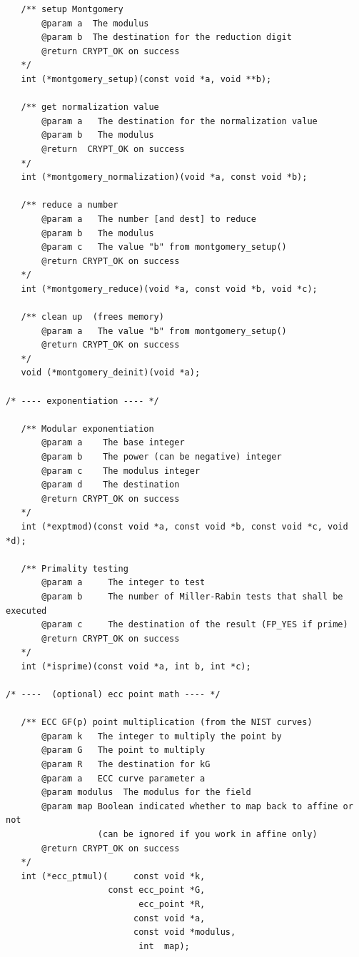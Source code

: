 \documentclass[synpaper]{book}
\begin{document}
\begin{small}
\begin{verbatim}
   /** setup Montgomery
       @param a  The modulus
       @param b  The destination for the reduction digit
       @return CRYPT_OK on success
   */
   int (*montgomery_setup)(const void *a, void **b);

   /** get normalization value
       @param a   The destination for the normalization value
       @param b   The modulus
       @return  CRYPT_OK on success
   */
   int (*montgomery_normalization)(void *a, const void *b);

   /** reduce a number
       @param a   The number [and dest] to reduce
       @param b   The modulus
       @param c   The value "b" from montgomery_setup()
       @return CRYPT_OK on success
   */
   int (*montgomery_reduce)(void *a, const void *b, void *c);

   /** clean up  (frees memory)
       @param a   The value "b" from montgomery_setup()
       @return CRYPT_OK on success
   */
   void (*montgomery_deinit)(void *a);

/* ---- exponentiation ---- */

   /** Modular exponentiation
       @param a    The base integer
       @param b    The power (can be negative) integer
       @param c    The modulus integer
       @param d    The destination
       @return CRYPT_OK on success
   */
   int (*exptmod)(const void *a, const void *b, const void *c, void *d);

   /** Primality testing
       @param a     The integer to test
       @param b     The number of Miller-Rabin tests that shall be executed
       @param c     The destination of the result (FP_YES if prime)
       @return CRYPT_OK on success
   */
   int (*isprime)(const void *a, int b, int *c);

/* ----  (optional) ecc point math ---- */

   /** ECC GF(p) point multiplication (from the NIST curves)
       @param k   The integer to multiply the point by
       @param G   The point to multiply
       @param R   The destination for kG
       @param a   ECC curve parameter a
       @param modulus  The modulus for the field
       @param map Boolean indicated whether to map back to affine or not
                  (can be ignored if you work in affine only)
       @return CRYPT_OK on success
   */
   int (*ecc_ptmul)(     const void *k,
                    const ecc_point *G,
                          ecc_point *R,
                         const void *a,
                         const void *modulus,
                          int  map);


\end{verbatim}
\end{small}
\end{document}
